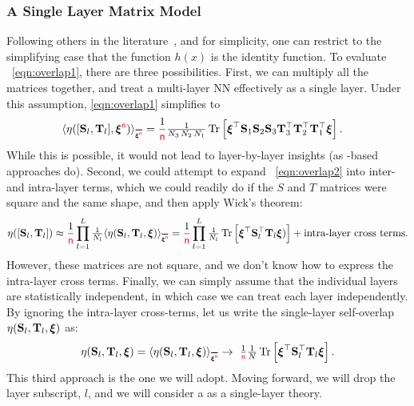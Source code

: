 \subsubsection{A Single Layer Matrix Model}
Following others in the literature~\cite{SMG2013_TR}, and for simplicity, one can restrict to the simplifying case that the function $h(x)$ is the identity function.
To evaluate \EQN~\ref{eqn:overlap1}, there are three possibilities.
First, we can multiply all the matrices together, and treat a multi-layer NN effectively as a single layer.
Under this assumption, \EQN \ref{eqn:overlap1} simplifies to
%
\begin{align}
\label{eqn:overlap2}
  \ETAMLPAVG &= \frac{1}{\ND}\tfrac{1}{N_3 \, N_2 \, N_1} 
  \Trace{ \boldsymbol{\xi}^\top 
    \SMAT_1 \SMAT_2 \SMAT_3 
    \TMAT_3^{\top} \TMAT_2^{\top} \TMAT_1^{\top} 
    \boldsymbol{\xi} }.
\end{align}
While this is possible, it would not lead to layer-by-layer insights (as \HTSR-based approaches do).
%
Second, we could attempt to expand \EQN~\ref{eqn:overlap2} into inter- and intra-layer terms, 
which we could readily do if the $S$ and $T$ matrices were square and the same shape, and then apply Wick's theorem:
\begin{align}
\ETAMLP\approx\frac{1}{\ND}\prod_{l=1}^{L}\tfrac{1}{N_l}\ETAMATAVG=
\frac{1}{\ND}\prod_{l=1}^{L}\tfrac{1}{N_l}\Trace{ \XI^{\top} \SMAT^{\top}_{l} \TMAT_{l} \XI) } +\text{intra-layer cross terms}.
\end{align}
However, these matrices are not square, and we don't know how to express the intra-layer cross terms.
%
Finally, we can simply assume that the individual layers are statistically independent, in which case we can treat each layer independently.
By ignoring the intra-layer cross-terms, let us write the single-layer self-overlap $\eta({\mathbf{S}}_l,{\mathbf{T}}_l,\boldsymbol{\xi})$ as:
\begin{align}
  \label{eqn:eta}
  \ETAMAT =
        \ETAMATAVG\rightarrow \
        \tfrac{1}{\ND}\tfrac{1}{N} \Trace{ \XI^{\top} \SMAT^{\top}_{l} \TMAT_{l} \XI }  .
\end{align}
This third approach is the one we will adopt.
Moving forward, we will drop the layer subscript, $l$, and we will consider a \SETOL as a single-layer theory.


